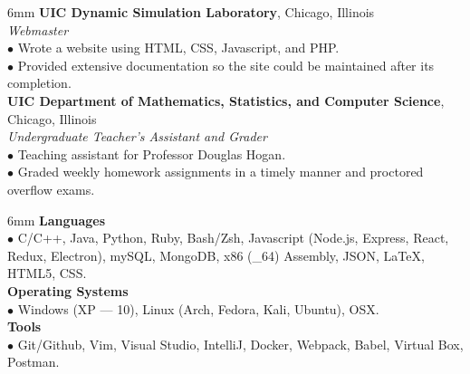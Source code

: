 \documentclass[11pt]{article}
\newenvironment{info}{\begin{adjustwidth}{6mm}{}}{\end{adjustwidth}}
\begin{document}
\begin{info}
{\bf UIC Dynamic Simulation Laboratory}, Chicago, Illinois \\
\textit{Webmaster} \\
$\bullet$ Wrote a website using HTML, CSS, Javascript, and PHP.\@ \\
$\bullet$ Provided extensive documentation so the site could be maintained after its completion. \\
{\bf UIC Department of Mathematics, Statistics, and Computer Science}, Chicago, Illinois \\
\textit{Undergraduate Teacher's Assistant and Grader} \\
$\bullet$ Teaching assistant for Professor Douglas Hogan. \\
$\bullet$ Graded weekly homework assignments in a timely manner and proctored overflow exams.
\end{info}

\begin{info}
{\bf Languages} \\
$\bullet$ C/C++, Java, Python, Ruby, Bash/Zsh, Javascript (Node.js, Express, React, Redux, Electron), mySQL, MongoDB, x86 (\_64) Assembly, JSON, \LaTeX, HTML5, CSS.\@ \\
{\bf Operating Systems} \\
$\bullet$ Windows (XP --- 10), Linux (Arch, Fedora, Kali, Ubuntu), OSX.\@ \\
{\bf Tools} \\
$\bullet$ Git/Github, Vim, Visual Studio, IntelliJ, Docker, Webpack, Babel, Virtual Box, Postman.
\end{info}
\end{document}
